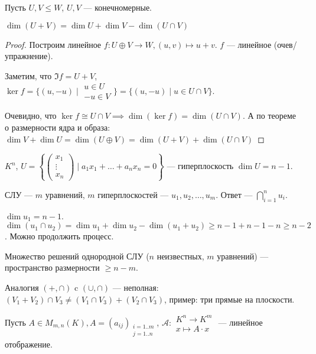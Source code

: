 \begin{theorem}
    Пусть $U, V \le W$, $U, V$ --- конечномерные.

   $\dim(U + V) = \dim U + \dim V - \dim(U \cap V)$
\end{theorem}
\begin{proof}
    Построим линейное $f\!: U \oplus V \to W, (u, v) \mapsto u + v$. $f$ --- линейное (очев/упражнение).

    Заметим, что $\Im f = U+V$,  $\ker f = \{(u, -u) \mid \begin{array}{r} u \in U \\ -u \in V \end{array} \} = \{ (u, -u) \mid u \in U \cap V \}$.

    Очевидно, что $\ker f \cong U \cap V \implies \dim (\ker f) = \dim (U \cap V)$. А по теореме о размерности ядра и образа:  $\dim V + \dim U = \dim(U \oplus V) = \dim(U + V) + \dim(U \cap V)$
\end{proof}
\begin{example}
    $K^n$, $U = \left\{ \begin{pmatrix} x_1 \\ \vdots \\ x_n \end{pmatrix} \mid a_1 x_1 + \ldots + a_n x_n = 0\right\}$ --- гиперплоскость $\dim U = n - 1$. 

    СЛУ ---  $m$ уравнений,  $m$ гиперплоскостей --- $u_1, u_2, \ldots, u_m$. Ответ --- $\bigcap\limits_{i=1}^n u_i$.

    $\dim u_1 = n - 1$. $\dim (u_1 \cap u_2) = \dim u_1 + \dim u_2 - \dim (u_1 + u_2) \ge n - 1 + n - 1 - n \ge n - 2$. Можно продолжить процесс.
\end{example}
\begin{consequence}
    Множество решений однородной СЛУ ($n$ неизвестных,  $m$ уравнений) --- пространство размерности $\ge n - m$.
\end{consequence}
\begin{remark}
    Аналогия $(+, \cap)$ c  $(\cup, \cap)$ --- неполная:  $(V_1 + V_2) \cap V_3 \neq (V_1 \cap V_3) + (V_2 \cap V_3)$, пример: три прямые на плоскости.
\end{remark}

Пусть $A \in M_{m, n}(K), A = (a_{ij})_{\substack{i = 1..m \\ j = 1..n}}$,  $\mathcal{A}\!: \begin{array}{c} K^n \to K^m \\ x \mapsto A \cdot x \end{array}$ --- линейное отображение.

